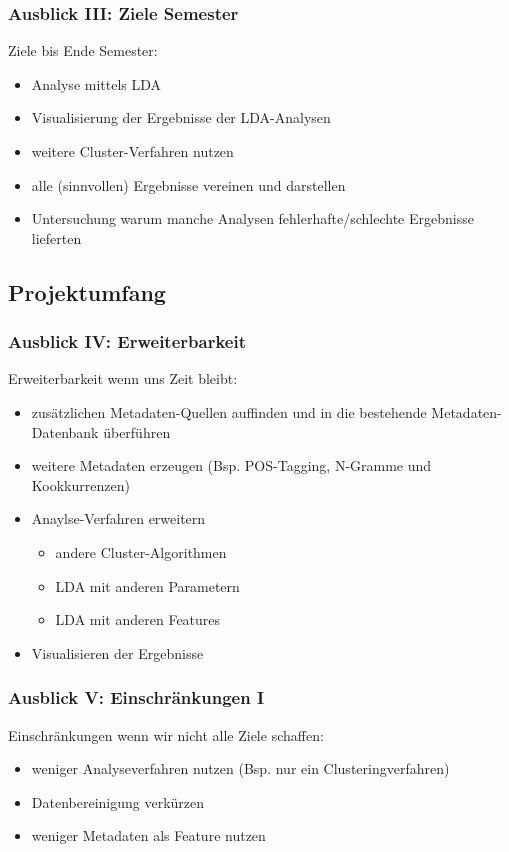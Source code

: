\documentclass[11pt, a4paper]{beamer}
\begin{document}
\begin{frame}
\frametitle{Ausblick III: Ziele Semester}

Ziele bis Ende Semester:
\begin{itemize}
	\item Analyse mittels LDA
	\item Visualisierung der Ergebnisse der LDA-Analysen
	\item weitere Cluster-Verfahren nutzen
	\item alle (sinnvollen) Ergebnisse vereinen und darstellen
	\item Untersuchung warum manche Analysen fehlerhafte/schlechte Ergebnisse lieferten
\end{itemize}
\end{frame}

\subsection{Projektumfang}
\begin{frame}
\frametitle{Ausblick IV: Erweiterbarkeit}

Erweiterbarkeit wenn uns Zeit bleibt:
\begin{itemize}
	\item zusätzlichen Metadaten-Quellen auffinden und in die bestehende Metadaten-Datenbank überführen
	\item weitere Metadaten erzeugen (Bsp. POS-Tagging, N-Gramme und Kookkurrenzen)
	\item Anaylse-Verfahren erweitern 
	\begin{itemize}
		\item andere Cluster-Algorithmen
		\item LDA mit anderen Parametern
		\item LDA mit anderen Features
	\end{itemize}
	\item Visualisieren der Ergebnisse
\end{itemize}
\end{frame}


\begin{frame}
\frametitle{Ausblick V: Einschränkungen I}

Einschränkungen wenn wir nicht alle Ziele schaffen:
\begin{itemize}
	\item weniger Analyseverfahren nutzen (Bsp. nur ein Clusteringverfahren)
	\item Datenbereinigung verkürzen
	\item weniger Metadaten als Feature nutzen
\end{itemize}
\end{frame}
\end{document}
